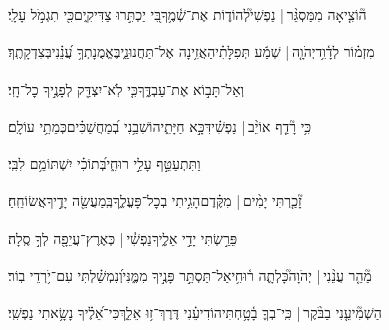 \documentclass[12pt]{article}
\newcommand{\vart}[1]{\Bfootnote{#1}}	%
\newcommand{\loc}[1]{\textsuperscript{\locf{#1}}}
\begin{document}
{\loc{ ח}~}‏ה֘וֹצִ֤יאָה מִמַּסְגֵּ֨ר |  נַפְשִׁי֮{\hfill}לְהוֹד֢וֹת אֶת־שְׁ֫מֶ֥ךָ\newline\hspace*{.5em}בִּ֭י יַכְתִּ֣רוּ צַדִּיקִ֑ים{\hfill}כִּ֖י תִגְמֹ֣ל עָלָֽי׃\par\pend
\ledpb
\pstart[\subsection*{\textcolor{red}{פרק קמג}}]\label{פרק קמג}
{\loc{ א}~}‏מִזְמ֗וֹר לְדָ֫וִ֥ד\edtext{\newline\hspace*{.5em}}{\lemma{*}\vart{2=פרשה פתוחה}}‏יְהֹוָ֤ה |  שְׁמַ֬ע תְּפִלָּתִ֗י{\hfill}הַאֲזִ֥ינָה אֶל־תַּחֲנוּנַ֑י\newline\hspace*{.5em}בֶּאֱמֻנָתְךָ֥ עֲ֝נֵ֗נִי{\hfill}בְּצִדְקָתֶֽךָ׃\par

{\loc{ ב}~}‏וְאַל־תָּב֣וֹא  אֶת־עַבְדֶּ֑ךָ{\hfill}כִּ֤י לֹֽא־יִצְדַּ֖ק לְפָנֶ֣יךָ כׇל־חָֽי׃\par

{\loc{ ג}~}‏כִּ֥י רָ֘דַ֤ף אוֹיֵ֨ב |  נַפְשִׁ֗י{\hfill}דִּכָּ֣א  חַיָּתִ֑י\newline\hspace*{.5em}הוֹשִׁבַ֥נִי בְ֝מַחֲשַׁכִּ֗ים{\hfill}כְּמֵתֵ֥י עוֹלָֽם׃\par

{\loc{ ד}~}‏וַתִּתְעַטֵּ֣ף עָלַ֣י רוּחִ֑י{\hfill}בְּ֝תוֹכִ֗י יִשְׁתּוֹמֵ֥ם לִבִּֽי׃\par

{\loc{ ה}~}‏זָ֘כַ֤רְתִּי יָמִ֨ים |  מִקֶּ֗דֶם{\hfill}הָגִ֥יתִי בְכׇל־פָּעֳלֶ֑ךָ\newline\hspace*{.5em}בְּֽמַעֲשֵׂ֖ה יָדֶ֣יךָ{\hfill}אֲשׂוֹחֵֽחַ׃\par

{\loc{ ו}~}‏פֵּרַ֣שְׂתִּי יָדַ֣י אֵלֶ֑יךָ{\hfill}נַפְשִׁ֓י |  כְּאֶרֶץ־עֲיֵפָ֖ה לְךָ֣ סֶֽלָה׃\par

{\loc{ ז}~}‏מַ֘הֵ֤ר עֲנֵ֨נִי |  יְהֹוָה֮{\hfill}כָּלְתָ֢ה ר֫וּחִ֥י\newline\hspace*{.5em}אַל־תַּסְתֵּ֣ר פָּנֶ֣יךָ מִמֶּ֑נִּי{\hfill}וְ֝נִמְשַׁ֗לְתִּי עִם־יֹ֥רְדֵי בֽוֹר׃\par

{\loc{ ח}~}‏הַשְׁמִ֘יעֵ֤נִי בַבֹּ֨קֶר |  {\hfill}כִּֽי־בְךָ֢ בָ֫טָ֥חְתִּי\newline\hspace*{.5em}הוֹדִיעֵ֗נִי דֶּרֶךְ־ז֥וּ אֵלֵ֑ךְ{\hfill}כִּי־אֵ֝לֶ֗יךָ נָשָׂ֥אתִי נַפְשִֽׁי׃\par
\end{document}
